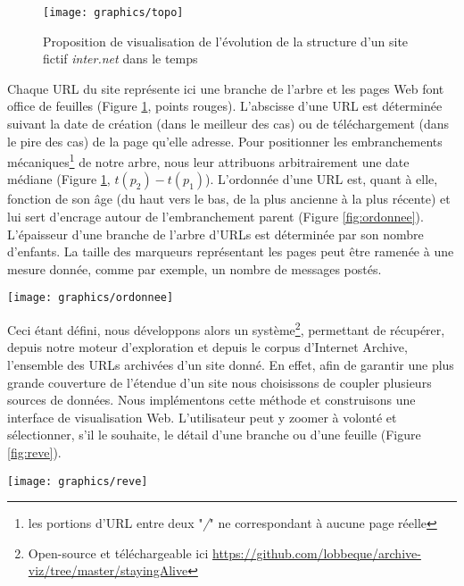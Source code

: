 \documentclass[symmetric,justified,marginals=raggedouter]{tufte-book}
\begin{document}
\begin{figure}
  \texttt{[image: graphics/topo]}
  \caption{Proposition de visualisation de l'évolution de la structure d'un site fictif \textit{inter.net} dans le temps}
  \label{fig:topo}
\end{figure}

\noindent Chaque URL du site représente ici une branche de l'arbre et les pages Web font office de feuilles (Figure \ref{fig:topo}, points rouges). L'abscisse d'une URL est déterminée suivant la date de création (dans le meilleur des cas) ou de téléchargement (dans le pire des cas) de la page qu'elle adresse. Pour positionner les embranchements mécaniques\footnote{les portions d'URL entre deux "\textit{/}" ne correspondant à aucune page réelle} de notre arbre, nous leur attribuons arbitrairement une date médiane (Figure \ref{fig:topo}, $t(p_2) - t(p_1)$). L'ordonnée d'une URL est, quant à elle, fonction de son âge (du haut vers le bas, de la plus ancienne à la plus récente) et lui sert d'encrage autour de l'embranchement parent (Figure \ref{fig:ordonnee}). L'épaisseur d'une branche de l'arbre d'URLs est déterminée par son nombre d'enfants. La taille des marqueurs représentant les pages peut être ramenée à une mesure donnée, comme par exemple, un nombre de messages postés.

\begin{marginfigure}%
  \texttt{[image: graphics/ordonnee]}
  \vspace*{0.2cm}  
  \caption{Positionnement de 3 pages (rouge) autour d'un embranchement parent (bleu)}
  \label{fig:ordonnee}
\end{marginfigure} 

Ceci étant défini, nous développons alors un système\footnote{Open-source et téléchargeable ici \url{https://github.com/lobbeque/archive-viz/tree/master/stayingAlive}}, permettant de récupérer, depuis notre moteur d'exploration et depuis le corpus d'Internet Archive, l'ensemble des URLs archivées d'un site donné. En effet, afin de garantir une plus grande couverture de l'étendue d'un site nous choisissons de coupler plusieurs sources de données. Nous implémentons cette méthode et construisons une interface de visualisation Web. L'utilisateur peut y zoomer à volonté et sélectionner, s'il le souhaite, le détail d'une branche ou d'une feuille (Figure \ref{fig:reve}).

\begin{figure*}
  \texttt{[image: graphics/reve]}
  \caption{Capture d'écran de l'évolution topologique de la section \textit{Interprétation des rêves, roqya, djinn} du forum de \textit{yabiladi.com}}
  \label{fig:reve}
\end{figure*}
\end{document}
